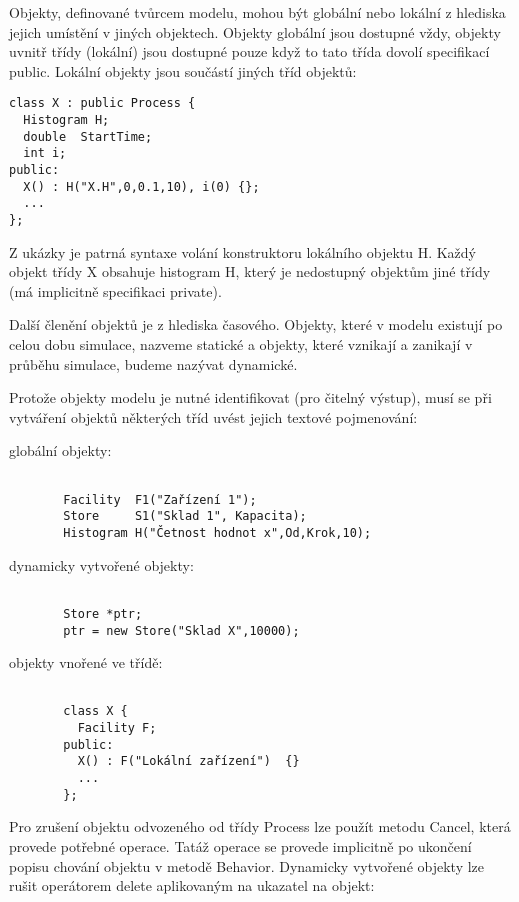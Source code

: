 \documentclass[a4paper]{article}
\begin{document}
Objekty, definované tvůrcem modelu, mohou být globální nebo
lokální z hlediska jejich umístění v jiných objektech. Objekty
globální jsou dostupné vždy, objekty uvnitř třídy (lokální) jsou
dostupné pouze když to tato třída dovolí specifikací public.
Lokální objekty jsou součástí jiných tříd objektů:

\begin{verbatim}
class X : public Process {
  Histogram H;
  double  StartTime;
  int i;
public:
  X() : H("X.H",0,0.1,10), i(0) {};
  ...
};
\end{verbatim}

Z ukázky je patrná syntaxe volání konstruktoru lokálního objektu
H. Každý objekt třídy X obsahuje histogram H, který je
nedostupný objektům jiné třídy (má implicitně specifikaci
private).

Další členění objektů je z hlediska časového. Objekty, které
v modelu existují po celou dobu simulace, nazveme statické
a objekty, které vznikají a zanikají v průběhu simulace, budeme
nazývat dynamické.

Protože objekty modelu je nutné identifikovat (pro čitelný
výstup), musí se při vytváření objektů některých tříd uvést
jejich textové pojmenování:

\begin{description}
\item[globální objekty:] 
\begin{verbatim}
  
  Facility  F1("Zařízení 1");
  Store     S1("Sklad 1", Kapacita);
  Histogram H("Četnost hodnot x",Od,Krok,10);
\end{verbatim}

\item[dynamicky vytvořené objekty:] 
\begin{verbatim}
  
  Store *ptr;
  ptr = new Store("Sklad X",10000);
\end{verbatim}

\item[objekty vnořené ve třídě:] 
\begin{verbatim}
  
  class X {
    Facility F;
  public:
    X() : F("Lokální zařízení")  {}
    ...
  };
\end{verbatim}

\end{description}

Pro zrušení objektu odvozeného od třídy Process lze použít
metodu Cancel, která provede potřebné operace. Tatáž operace se
provede implicitně po ukončení popisu chování objektu v metodě
Behavior. Dynamicky vytvořené objekty lze rušit operátorem
delete aplikovaným na ukazatel na objekt:
\end{document}
